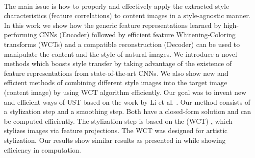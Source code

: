\\
The main issue is how to properly and effectively apply the extracted style characteristics (feature correlations) to content images in a style-agnostic manner.\newline
\\
In this work we show how the generic feature representations learned by high-performing CNNs (Encoder) followed by efficient feature Whitening-Coloring transforms (WCTs) and a compatible reconstruction (Decoder) can be used to manipulate the content and the style of natural images.
We introduce a novel methods which boosts style transfer by taking advantage of the existence of feature representations from state-of-the-art CNNs.  
We also show new and efficient methods of combining different style images into the target image (content image) by using WCT algorithm efficiently.
Our goal was to invent new and efficient ways of UST based on the work by Li et al. \cite{bib11}.
Our method consists of a stylization step and a smoothing step. Both have a closed-form solution and can be computed efficiently. The stylization step is based on the (WCT) \cite{bib10}, which stylizes images via feature projections. The WCT was designed for artistic stylization.
Our results show similar results as presented in \cite{bib10} while showing efficiency in computation.